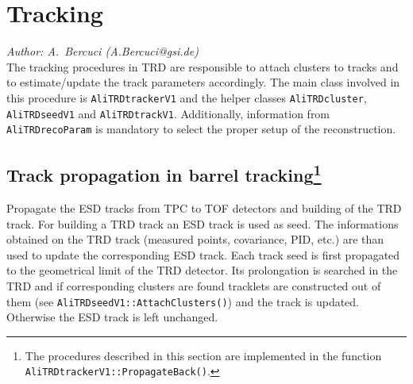 \documentclass{alicetdr}
\begin{document}
\setcounter{footnote}{0}
\section{Tracking}\label{REC:Tracking:}
{\it Author: A.~Bercuci (A.Bercuci@gsi.de)}\\

The tracking procedures in TRD are responsible to attach clusters to tracks
and to estimate/update the track parameters accordingly. The main class involved
in this procedure is {\tt AliTRDtrackerV1} and the helper classes {\tt AliTRDcluster},
{\tt AliTRDseedV1} and {\tt AliTRDtrackV1}.  Additionally, information from
{\tt AliTRDrecoParam} is mandatory to select the proper setup of the reconstruction.
\\

\subsection[Track propagation barrel]{Track propagation in barrel tracking\footnote{The
procedures described in this section are implemented in the function
{\tt AliTRDtrackerV1::PropagateBack()}.}}\label{REC:Tracking:Propagate}

Propagate the ESD tracks from TPC to TOF detectors and building of the TRD track. For
building a TRD track an ESD track is used as seed. The informations obtained on the TRD
track (measured points, covariance, PID, etc.) are than used to update the corresponding
ESD track. Each track seed is first propagated to the geometrical limit of the TRD
detector. Its prolongation is searched in the TRD and if corresponding clusters are found
tracklets are constructed out of them (see {\tt AliTRDseedV1::AttachClusters()}) and the
track is updated. Otherwise the ESD track is left unchanged.
\end{document}

